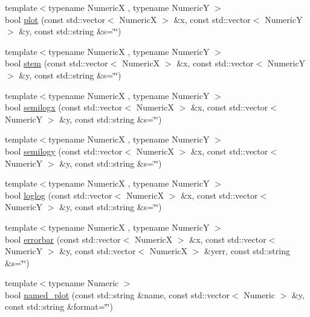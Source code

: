 \begin{DoxyCompactItemize}
\item 
{\footnotesize template$<$typename NumericX , typename NumericY $>$ }\\bool \hyperlink{namespacematplotlibcpp_a19804a8cbd413b15c8d07848d7a5890e}{plot} (const std\+::vector$<$ NumericX $>$ \&x, const std\+::vector$<$ NumericY $>$ \&y, const std\+::string \&s=\char`\"{}\char`\"{})
\item 
{\footnotesize template$<$typename NumericX , typename NumericY $>$ }\\bool \hyperlink{namespacematplotlibcpp_a02a1939d1d0b7b61878bd7cf2d8cd7f3}{stem} (const std\+::vector$<$ NumericX $>$ \&x, const std\+::vector$<$ NumericY $>$ \&y, const std\+::string \&s=\char`\"{}\char`\"{})
\item 
{\footnotesize template$<$typename NumericX , typename NumericY $>$ }\\bool \hyperlink{namespacematplotlibcpp_ad25d4429577dbdd8c087a0ba6869840b}{semilogx} (const std\+::vector$<$ NumericX $>$ \&x, const std\+::vector$<$ NumericY $>$ \&y, const std\+::string \&s=\char`\"{}\char`\"{})
\item 
{\footnotesize template$<$typename NumericX , typename NumericY $>$ }\\bool \hyperlink{namespacematplotlibcpp_a4dce9b4c1c16c1dab0cffd11588d4db8}{semilogy} (const std\+::vector$<$ NumericX $>$ \&x, const std\+::vector$<$ NumericY $>$ \&y, const std\+::string \&s=\char`\"{}\char`\"{})
\item 
{\footnotesize template$<$typename NumericX , typename NumericY $>$ }\\bool \hyperlink{namespacematplotlibcpp_a6cfa8cba00f52a2c4614fa7a8a0bcd2b}{loglog} (const std\+::vector$<$ NumericX $>$ \&x, const std\+::vector$<$ NumericY $>$ \&y, const std\+::string \&s=\char`\"{}\char`\"{})
\item 
{\footnotesize template$<$typename NumericX , typename NumericY $>$ }\\bool \hyperlink{namespacematplotlibcpp_a1ed29787f67ecb8c156e7c4abbcd25b4}{errorbar} (const std\+::vector$<$ NumericX $>$ \&x, const std\+::vector$<$ NumericY $>$ \&y, const std\+::vector$<$ NumericX $>$ \&yerr, const std\+::string \&s=\char`\"{}\char`\"{})
\item 
{\footnotesize template$<$typename Numeric $>$ }\\bool \hyperlink{namespacematplotlibcpp_a6461c03041d9947a0e3b3593b5b72c95}{named\+\_\+plot} (const std\+::string \&name, const std\+::vector$<$ Numeric $>$ \&y, const std\+::string \&format=\char`\"{}\char`\"{})

\end{DoxyCompactItemize}
